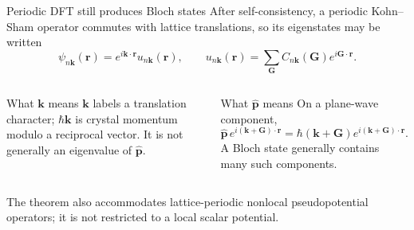 \documentclass[aspectratio=169,10pt]{beamer}
\begin{document}
\begin{frame}{Periodic DFT still produces Bloch states}
  After self-consistency, a periodic Kohn--Sham operator commutes with lattice
  translations, so its eigenstates may be written
  \cite{kohn1965}
  \[
    \psi_{n\mathbf k}(\mathbf r)
      =e^{i\mathbf k\cdot\mathbf r}u_{n\mathbf k}(\mathbf r),
    \qquad
    u_{n\mathbf k}(\mathbf r)
      =\sum_{\mathbf G}C_{n\mathbf k}(\mathbf G)e^{i\mathbf G\cdot\mathbf r}.
  \]
  \begin{columns}[T]
      \begin{block}{What $\mathbf k$ means}
        $\mathbf k$ labels a translation character; $\hbar\mathbf k$ is crystal
        momentum modulo a reciprocal vector. It is not generally an eigenvalue of
        $\hat{\mathbf p}$.
      \end{block}
      \begin{block}{What $\hat{\mathbf p}$ means}
        On a plane-wave component,
        \[
          \hat{\mathbf p}\,e^{i(\mathbf k+\mathbf G)\cdot\mathbf r}
          =\hbar(\mathbf k+\mathbf G)e^{i(\mathbf k+\mathbf G)\cdot\mathbf r}.
        \]
        A Bloch state generally contains many such components.
      \end{block}
  \end{columns}

  \centering
  The theorem also accommodates lattice-periodic nonlocal pseudopotential operators;
  it is not restricted to a local scalar potential.
\end{frame}
\end{document}
